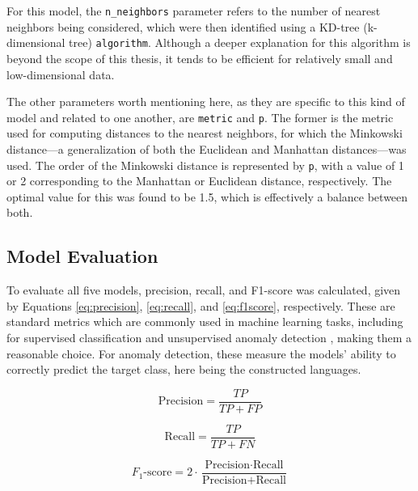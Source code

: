 \documentclass[12pt,a4paper]{article}
\numberwithin{figure}{section}
\numberwithin{table}{section}
\numberwithin{definition}{section}
\begin{document}
For this model, the \texttt{n\_neighbors} parameter refers to the number of nearest neighbors being considered, which were then identified using a KD-tree (k-dimensional tree) \texttt{algorithm}. Although a deeper explanation for this algorithm is beyond the scope of this thesis, it tends to be efficient for relatively small and low-dimensional data. 

The other parameters worth mentioning here, as they are specific to this kind of model and related to one another, are \texttt{metric} and \texttt{p}. The former is the metric used for computing distances to the nearest neighbors, for which the Minkowski distance---a generalization of both the Euclidean and Manhattan distances---was used. The order of the Minkowski distance is represented by \texttt{p}, with a value of 1 or 2 corresponding to the Manhattan or Euclidean distance, respectively. The optimal value for this was found to be 1.5, which is effectively a balance between both.

\subsection{Model Evaluation}
\label{ssec:modelevaluation}


To evaluate all five models, precision, recall, and F1-score was calculated, given by Equations \ref{eq:precision}, \ref{eq:recall}, and \ref{eq:f1score}, respectively. These are standard metrics which are commonly used in machine learning tasks, including for supervised classification and unsupervised anomaly detection \parencite{Agyemang2024article,Braei2020article,Maya2019article,Elmrabit2020article,Oktafiani2024article}, making them a reasonable choice. For anomaly detection, these measure the models' ability to correctly predict the target class, here being the constructed languages.

\begin{equation}
  \label{eq:precision}
    \text{Precision} = \frac{TP}{TP + FP}
  \end{equation}
  
  \begin{equation}
  \label{eq:recall}
    \text{Recall} = \frac{TP}{TP + FN}
  \end{equation}
  
  \begin{equation}
  \label{eq:f1score}
    F_1\text{-score} = 2 \cdot \frac{\text{Precision} \cdot \text{Recall}}{\text{Precision} + \text{Recall}}
  \end{equation}
\end{document}

